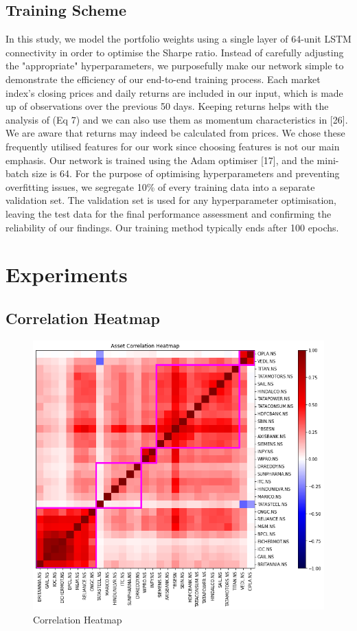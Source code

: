 \subsection{Training Scheme}
In this study, we model the portfolio weights using a single layer of 64-unit LSTM connectivity in order to optimise the Sharpe ratio. Instead of carefully adjusting the "appropriate" hyperparameters, we purposefully make our network simple to demonstrate the efficiency of our end-to-end training process. Each market index's closing prices and daily returns are included in our input, which is made up of observations over the previous 50 days. Keeping returns helps with the analysis of (Eq 7) and we can also use them as momentum characteristics in [26]. We are aware that returns may indeed be calculated from prices. We chose these frequently utilised features for our work since choosing features is not our main emphasis. Our network is trained using the Adam optimiser [17], and the mini-batch size is 64. For the purpose of optimising hyperparameters and preventing overfitting issues, we segregate 10\% of every training data into a separate validation set. The validation set is used for any hyperparameter optimisation, leaving the test data for the final performance assessment and confirming the reliability of our findings. Our training method typically ends after 100 epochs.

\section{Experiments}
\graphicspath{ {images/} }
\subsection{Correlation Heatmap}
\begin{figure}[H]
\centering
   \includegraphics[width=1.0\textwidth]{correlation.png}
      \caption{Correlation Heatmap}
       \label{corel}
\end{figure}

